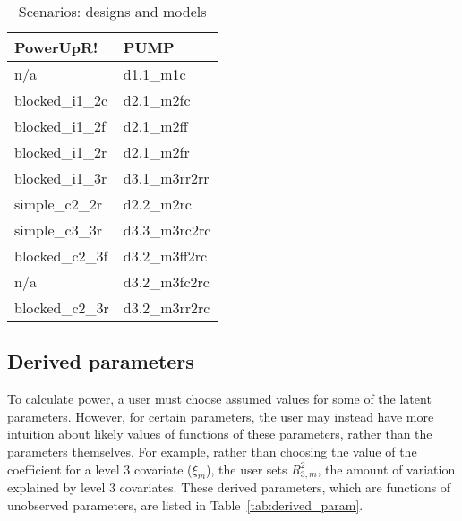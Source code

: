 \documentclass[12pt]{article}
\begin{document}
\begin{table}[h!]
\begin{tabular}{l | l}
\textbf{PowerUpR!}	& \textbf{PUMP} \\ \hline
n/a 				& d1.1\_m1c \\
blocked\_i1\_2c 	& d2.1\_m2fc \\
blocked\_i1\_2f 	& d2.1\_m2ff \\
blocked\_i1\_2r 	& d2.1\_m2fr \\
blocked\_i1\_3r 	& d3.1\_m3rr2rr \\
simple\_c2\_2r 		& d2.2\_m2rc \\
simple\_c3\_3r 		& d3.3\_m3rc2rc \\
blocked\_c2\_3f 	& d3.2\_m3ff2rc \\
n/a					& d3.2\_m3fc2rc \\
blocked\_c2\_3r 	& d3.2\_m3rr2rc \\
\end{tabular}
\caption{Scenarios: designs and models\label{tab:names}}
\end{table}



\subsection{Derived parameters}

To calculate power, a user must choose assumed values for some of the latent parameters.
However, for certain parameters, the user may instead have more intuition about likely values of functions of these parameters, rather than the parameters themselves.
For example, rather than choosing the value of the coefficient for a level 3 covariate ($\xi_m$), the user sets $R_{3,m}^2$, the amount of variation explained by level 3 covariates. 
These derived parameters, which are functions of unobserved parameters, are listed in Table~\ref{tab:derived_param}.
\end{document}
